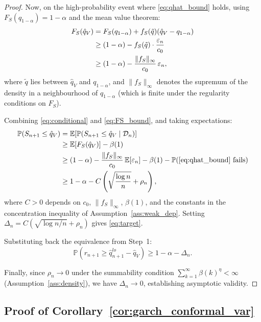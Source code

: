 \documentclass[preprint,11pt,authoryear]{elsarticle}
\newcommand{\1}{\boldsymbol{1}}
\begin{document}
\begin{proof}
		Now, on the high-probability event where \eqref{eq:qhat_bound} holds, using $F_S(q_{1-\alpha})=1-\alpha$ and the mean value theorem:
		\begin{align}
			F_S(\hat q_V) &= F_S(q_{1-\alpha}) + f_S(\tilde q)(\hat q_V - q_{1-\alpha}) \notag\\
			&\ge (1-\alpha) - f_S(\tilde q)\cdot \frac{\varepsilon_n}{c_0} \notag\\
			&\ge (1-\alpha) - \frac{\|f_S\|_\infty}{c_0}\,\varepsilon_n, \label{eq:FS_bound}
		\end{align}
		where $\tilde q$ lies between $\hat q_V$ and $q_{1-\alpha}$, and $\|f_S\|_\infty$ denotes the supremum of the density in a neighbourhood of $q_{1-\alpha}$ (which is finite under the regularity conditions on $F_S$).
		
		Combining \eqref{eq:conditional} and \eqref{eq:FS_bound}, and taking expectations:
		\begin{align*}
			\mathbb P(S_{n+1}\le \hat q_V)
			&= \mathbb E\!\left[\mathbb P(S_{n+1}\le \hat q_V \mid \mathcal D_n)\right] \\
			&\ge \mathbb E\!\left[F_S(\hat q_V)\right] - \beta(1) \\
			&\ge (1-\alpha) - \frac{\|f_S\|_\infty}{c_0}\,\mathbb E[\varepsilon_n] - \beta(1) - \mathbb P(\text{\eqref{eq:qhat_bound} fails}) \\
			&\ge 1-\alpha - C\left(\sqrt{\frac{\log n}{n}}+\rho_n\right),
		\end{align*}
		where $C>0$ depends on $c_0$, $\|f_S\|_\infty$, $\beta(1)$, and the constants in the concentration inequality of Assumption~\ref{ass:weak_dep}. Setting $\Delta_n = C(\sqrt{\log n / n}+\rho_n)$ gives \eqref{eq:target}.
		
		Substituting back the equivalence from Step~1:
		\[
		\mathbb P\!\left(r_{n+1} \ge \hat q_{n+1}^{lo}-\hat q_V\right) \ge 1-\alpha-\Delta_n.
		\]
		
		Finally, since $\rho_n\to 0$ under the summability condition $\sum_{k=1}^\infty \beta(k)^\eta<\infty$ (Assumption~\ref{ass:density}), we have $\Delta_n\to 0$, establishing asymptotic validity.
	\end{proof}
	
	\subsection{Proof of Corollary~\ref{cor:garch_conformal_var}}
	
\end{document}
